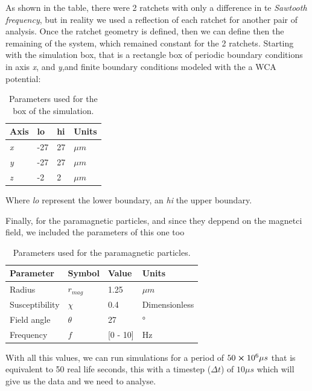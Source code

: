 As shown in the table, there were 2 ratchets with only a difference in te \textit{Sawtooth frequency}, but in reality we used a reflection of each ratchet for another pair of analysis. Once the ratchet geometry is defined, then we can define then the remaining of the system, which remained constant for the 2 ratchets. Starting with the simulation box, that is a rectangle box of periodic boundary conditions in axis \textit{x}, and \textit{y},and finite boundary conditions modeled with the a WCA potential:



\begin{table}[H]
\centering
\caption[Simulation box physical parameters.]{Parameters used for the box of the simulation.}
\begin{tabular}{l l l l}
\hline
Axis & lo  & hi & Units \\
\hline
\textit{x} & -27 & 27 & \( \mu m\) \\
\textit{y} & -27 & 27 & \( \mu m\) \\
\textit{z} & -2  & 2   & \( \mu m\)\\ 
\hline
\end{tabular}
\end{table}

Where \textit{lo} represent the lower boundary, an \textit{hi} the upper boundary.

Finally, for the paramagnetic particles, and since they deppend on the magnetci field, we included the parameters of this one too


\begin{table}[H]
\centering
\caption[Paramagnetic colloids parameters.]{Parameters used for the paramagnetic particles.}
\begin{tabular}{l l l l}
\hline
Parameter & Symbol  & Value & Units \\
\hline
Radius & $r_{mag}$ &  1.25 &\( \mu m\) \\
Susceptibility & $\chi$ & 0.4 & Dimensionless\\
Field angle & $\theta$ & 27 & °\\
Frequency & $f$ & [0 - 10] & Hz\\
\hline
\end{tabular}
\end{table}

With all this values, we can run simulations for a period of $50 \cross 10^{6} \mu s$ that is equivalent to 50 real life seconds, this with a timestep ($\Delta t$) of  $10 \mu s$ which will give us the data and we need to analyse.

